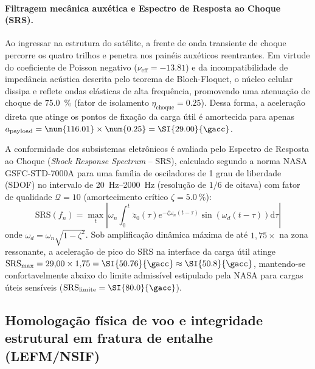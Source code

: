 \paragraph*{Filtragem mecânica auxética e Espectro de Resposta ao Choque (SRS).}
Ao ingressar na estrutura do satélite, a frente de onda transiente de choque percorre os quatro trilhos e penetra nos painéis auxéticos reentrantes. Em virtude do coeficiente de Poisson negativo ($\nu_{\text{eff}} = \num{-13.81}$) e da incompatibilidade de impedância acústica descrita pelo teorema de Bloch-Floquet, o núcleo celular dissipa e reflete ondas elásticas de alta frequência, promovendo uma atenuação de choque de \SI{75.0}{\percent} (fator de isolamento $\eta_{\text{choque}} = \num{0.25}$). Dessa forma, a aceleração direta que atinge os pontos de fixação da carga útil é amortecida para apenas $a_{\text{payload}} = \num{116.01} \times \num{0.25} = \SI{29.00}{\gacc}$.

A conformidade dos subsistemas eletrônicos é avaliada pelo Espectro de Resposta ao Choque (\textit{Shock Response Spectrum} -- SRS), calculado segundo a norma NASA GSFC-STD-7000A para uma família de osciladores de 1 grau de liberdade (SDOF) no intervalo de \SIrange{20}{2000}{\hertz} (resolução de $1/6$ de oitava) com fator de qualidade $\mathcal{Q} = 10$ (amortecimento crítico $\zeta = \SI{5.0}{\percent}$):
\begin{equation}
  \text{SRS}(f_n) = \max_{t} \left| \omega_n \int_{0}^{t} \ddot{z}_0(\tau) e^{-\zeta \omega_n (t-\tau)} \sin\!\left(\omega_d (t-\tau)\right) \mathrm{d}\tau \right|
  \label{eq:srs-calculo}
\end{equation}
onde $\omega_d = \omega_n \sqrt{1 - \zeta^2}$. Sob amplificação dinâmica máxima de até $1{,}75\times$ na zona ressonante, a aceleração de pico do SRS na interface da carga útil atinge $\text{SRS}_{\max} = 29{,}00 \times 1{,}75 = \SI{50.76}{\gacc} \approx \SI{50.8}{\gacc}$, mantendo-se confortavelmente abaixo do limite admissível estipulado pela NASA para cargas úteis sensíveis ($\text{SRS}_{\text{limite}} = \SI{80.0}{\gacc}$).

\subsection{Homologação física de voo e integridade estrutural em fratura de entalhe (LEFM/NSIF)}
\label{subsec:validacao}

